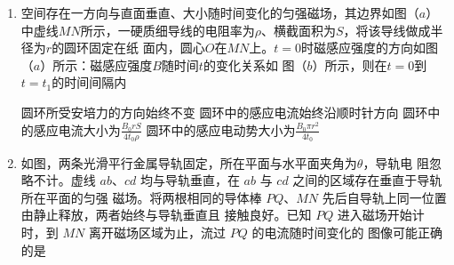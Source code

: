 


\begin{enumerate}
\item
{}
空间存在一方向与直面垂直、大小随时间变化的匀强磁场，其边界如图（$ a $）
中虚线$ MN $所示，一硬质细导线的电阻率为$ \rho $、横截面积为$ S $，将该导线做成半径为$ r $的圆环固定在纸
面内，圆心$ O $在$ MN $上。$ t=0 $时磁感应强度的方向如图（$ a $）所示：磁感应强度$ B $随时间$ t $的变化关系如
图（$ b $）所示，则在$ t=0 $到$ t= t_{1} $的时间间隔内  
\begin{figure}[h!]
\centering
\begin{subfigure}{0.4\linewidth}
\centering
 
\caption{}\label{}
\end{subfigure}
\begin{subfigure}{0.4\linewidth}
\centering
 
\caption{}\label{}
\end{subfigure}
\end{figure}


\fourchoices
{圆环所受安培力的方向始终不变}
{圆环中的感应电流始终沿顺时针方向}
{圆环中的感应电流大小为$\frac{B_{0} r S}{4 t_{0} \rho}$}
{圆环中的感应电动势大小为$\frac{B_{0} \pi r^{2}}{4 t_{0}}$}


\item 
{}
如图，两条光滑平行金属导轨固定，所在平面与水平面夹角为$ \theta $，导轨电
阻忽略不计。虚线 $ ab $、$ cd $ 均与导轨垂直，在 $ ab $ 与 $ cd $ 之间的区域存在垂直于导轨所在平面的匀强
磁场。将两根相同的导体棒 $ PQ $、$ MN $ 先后自导轨上同一位置由静止释放，两者始终与导轨垂直且
接触良好。已知 $ PQ $ 进入磁场开始计时，到 $ MN $ 离开磁场区域为止，流过 $ PQ $ 的电流随时间变化的
图像可能正确的是  
\begin{figure}[h!]
\centering

\end{figure}


\pfourchoices
{}
{}
{}
{}





\end{enumerate}
